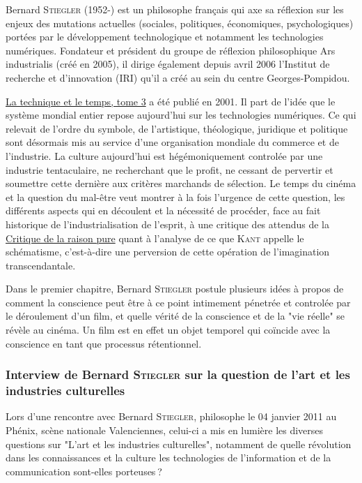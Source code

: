 \documentclass[a4paper,10pt]{article}
\begin{document}
Bernard \textsc{Stiegler} (1952-) est un philosophe français qui axe sa réflexion sur les enjeux des mutations actuelles (sociales, politiques, économiques, psychologiques) portées par le développement technologique et notamment les technologies numériques. Fondateur et président du groupe de réflexion philosophique Ars industrialis (créé en 2005), il dirige également depuis avril 2006 l'Institut de recherche et d'innovation (IRI) qu'il a créé au sein du centre Georges-Pompidou.

\underline{La technique et le temps, tome 3} a été publié en 2001. Il part de l'idée que le système mondial entier repose aujourd'hui sur les technologies numériques. Ce qui relevait de l'ordre du symbole, de l'artistique, théologique, juridique et politique sont désormais mis au service d'une organisation mondiale du commerce et de l'industrie. La culture aujourd'hui est hégémoniquement controlée par une industrie tentaculaire, ne recherchant que le profit, ne cessant de pervertir et soumettre cette dernière aux critères marchands de sélection. Le temps du cinéma et la question du mal-être veut montrer à la fois l’urgence de cette question, les différents aspects qui en découlent et la nécessité de procéder, face au fait historique de l’industrialisation de l’esprit, à une critique des attendus de la \underline{Critique de la raison pure} quant à l’analyse de ce que \textsc{Kant} appelle le schématisme, c'est-à-dire une perversion de cette opération de l’imagination transcendantale.

Dans le premier chapitre, Bernard \textsc{Stiegler} postule plusieurs idées à propos de comment la conscience peut être à ce point intimement pénetrée et controlée par le déroulement d'un film, et quelle vérité de la conscience et de la "vie réelle" se révèle au cinéma. Un film est en effet un objet temporel qui coïncide avec la conscience en tant que processus rétentionnel.

\subsubsection{Interview de Bernard \textsc{Stiegler} sur la question de l'art et les industries culturelles}

Lors d'une rencontre avec Bernard \textsc{Stiegler}, philosophe le 04 janvier 2011 au Phénix, scène nationale Valenciennes, celui-ci a mis en lumière les diverses questions sur  "L'art et les industries culturelles", notamment de quelle révolution dans les connaissances et la culture les technologies de l’information et de la communication sont-elles porteuses ?
\end{document}
